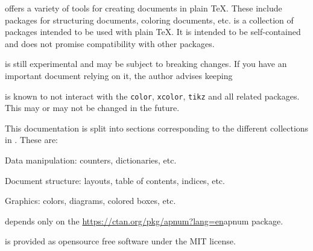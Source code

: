 \pdftoolbox{} offers a variety of tools for creating documents in plain \TeX.
These include packages for structuring documents, coloring documents, etc.
\pdftoolbox{} is a collection of packages intended to be used with plain \TeX.
It is intended to be self-contained and does not promise compatibility with other packages.

\bwarning

    \pdftoolbox{} is still experimental and may be subject to breaking changes.
    If you have an important document relying on it, the author advises keeping

\eppbox

\bwarning

    \pdftoolbox{} is known to not interact with the {\tt color}, {\tt xcolor}, {\tt tikz} and all related packages.
    This may or may not be changed in the future.

\eppbox

This documentation is split into sections corresponding to the different collections in \pdftoolbox.
These are:
\benum
    \item Data manipulation: counters, dictionaries, etc.
    \item Document structure: layouts, table of contents, indices, etc.
    \item Graphics: colors, diagrams, colored boxes, etc.
\eenum

\pdftoolbox{} depends only on the \url{https://ctan.org/pkg/apnum?lang=en}{apnum} package.

\pdftoolbox{} is provided as opensource free software under the MIT license.

